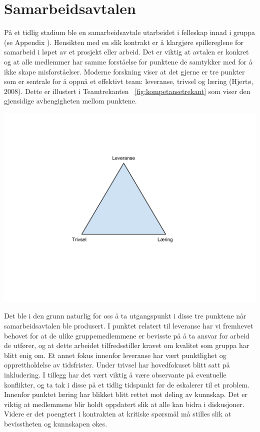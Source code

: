 \section{Samarbeidsavtalen}
På et tidlig stadium ble en samarbeidsavtale utarbeidet i felleskap innad i gruppa (se Appendix \cite{appendix:samarbeidsavtale}). Hensikten med en slik kontrakt er å klargjøre spillereglene for samarbeid i løpet av et prosjekt eller arbeid. Det er viktig at avtalen er konkret og at alle medlemmer har samme forståelse for punktene de samtykker med for å ikke skape misforståelser. Moderne forskning viser at det gjerne er tre punkter som er sentrale for å oppnå et effektivt team: leveranse, trivsel og læring (Hjertø, 2008). Dette er illustert i Teamtrekanten ~\ref{fig:kompetansetrekant} som viser den gjensidige avhengigheten mellom punktene.\\

\begin{center}
\includegraphics[clip=true, width=1 \textwidth,
trim=0cm 0cm 0cm 0cm]{kompetansetrekant.pdf}
\label{fig:kompetansetrekant}
\end{center}

Det ble i den grunn naturlig for oss å ta utgangspunkt i disse tre punktene når samarbeidsavtalen ble produsert. I punktet relatert til leveranse har vi fremhevet behovet for at de ulike gruppemedlemmene er bevisste på å ta ansvar for arbeid de utfører, og at dette arbeidet tilfredsstiller kravet om kvalitet som gruppa har blitt enig om. Et annet fokus innenfor leveranse har vært punktlighet og opprettholdelse av tidsfrister. Under trivsel har hovedfokuset blitt satt på inkludering. I tillegg har det vært viktig å være observante på eventuelle konflikter, og ta tak i disse på et tidlig tidspunkt før de eskalerer til et problem. Innenfor punktet læring har blikket blitt rettet mot deling av kunnskap. Det er viktig at medlemmene blir holdt oppdatert slik at alle kan bidra i diskusjoner. Videre er det poengtert i kontrakten at kritiske spørsmål må stilles slik at bevisstheten og kunnskapen økes.\\

